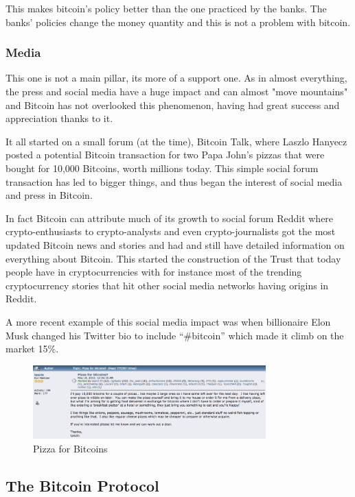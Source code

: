 \documentclass{article}
\newcommand\tab[1][1cm]{\hspace*{#1}}
\begin{document}
This makes bitcoin's policy better than the one practiced by the banks. The banks' policies change the money quantity and this is not a problem with bitcoin.

\subsubsection{Media}

\tab This one is not a main pillar, its more of a support one. As in almost everything, the press and social media have a huge impact and can almost "move mountains" and Bitcoin has not overlooked this phenomenon, having had great success and appreciation thanks to it.

It all started on a small forum (at the time), Bitcoin Talk, where Laszlo Hanyecz posted a potential Bitcoin transaction for two Papa John’s pizzas that were bought for 10,000 Bitcoins, worth millions today. This simple social forum transaction has led to bigger things, and thus began the interest of social media and press in Bitcoin.

In fact Bitcoin can attribute much of its growth to social forum Reddit where crypto-enthusiasts to crypto-analysts and even crypto-journalists got the most updated Bitcoin news and stories and had and still have detailed information on everything about Bitcoin. This started the construction of the Trust that today people have in cryptocurrencies with for instance most of the trending cryptocurrency stories that hit other social media networks  having origins in Reddit.

A more recent example of this social media impact was when billionaire Elon Musk changed his Twitter bio to include “#bitcoin” which made it climb on the market 15\%.

\begin{figure}[H]
    \begin{center}
        \includegraphics[width=0.8\textwidth]{images/pizzas.png}
        \caption{Pizza for Bitcoins}
    \end{center}
\end{figure}


\subsection{The Bitcoin Protocol}
\end{document}
